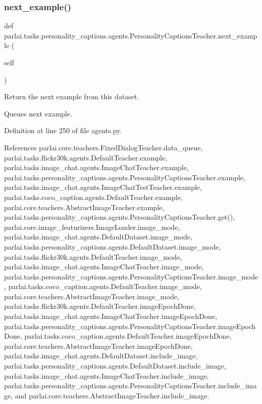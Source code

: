 \subsubsection{\texorpdfstring{next\+\_\+example()}{next\_example()}}
{\footnotesize\ttfamily def parlai.\+tasks.\+personality\+\_\+captions.\+agents.\+Personality\+Captions\+Teacher.\+next\+\_\+example (\begin{DoxyParamCaption}\item[{}]{self }\end{DoxyParamCaption})}

\begin{DoxyVerb}Return the next example from this dataset.

Queues next example.
\end{DoxyVerb}
 

Definition at line 250 of file agents.\+py.



References parlai.\+core.\+teachers.\+Fixed\+Dialog\+Teacher.\+data\+\_\+queue, parlai.\+tasks.\+flickr30k.\+agents.\+Default\+Teacher.\+example, parlai.\+tasks.\+image\+\_\+chat.\+agents.\+Image\+Chat\+Teacher.\+example, parlai.\+tasks.\+personality\+\_\+captions.\+agents.\+Personality\+Captions\+Teacher.\+example, parlai.\+tasks.\+image\+\_\+chat.\+agents.\+Image\+Chat\+Test\+Teacher.\+example, parlai.\+tasks.\+coco\+\_\+caption.\+agents.\+Default\+Teacher.\+example, parlai.\+core.\+teachers.\+Abstract\+Image\+Teacher.\+example, parlai.\+tasks.\+personality\+\_\+captions.\+agents.\+Personality\+Captions\+Teacher.\+get(), parlai.\+core.\+image\+\_\+featurizers.\+Image\+Loader.\+image\+\_\+mode, parlai.\+tasks.\+image\+\_\+chat.\+agents.\+Default\+Dataset.\+image\+\_\+mode, parlai.\+tasks.\+personality\+\_\+captions.\+agents.\+Default\+Dataset.\+image\+\_\+mode, parlai.\+tasks.\+flickr30k.\+agents.\+Default\+Teacher.\+image\+\_\+mode, parlai.\+tasks.\+image\+\_\+chat.\+agents.\+Image\+Chat\+Teacher.\+image\+\_\+mode, parlai.\+tasks.\+personality\+\_\+captions.\+agents.\+Personality\+Captions\+Teacher.\+image\+\_\+mode, parlai.\+tasks.\+coco\+\_\+caption.\+agents.\+Default\+Teacher.\+image\+\_\+mode, parlai.\+core.\+teachers.\+Abstract\+Image\+Teacher.\+image\+\_\+mode, parlai.\+tasks.\+flickr30k.\+agents.\+Default\+Teacher.\+image\+Epoch\+Done, parlai.\+tasks.\+image\+\_\+chat.\+agents.\+Image\+Chat\+Teacher.\+image\+Epoch\+Done, parlai.\+tasks.\+personality\+\_\+captions.\+agents.\+Personality\+Captions\+Teacher.\+image\+Epoch\+Done, parlai.\+tasks.\+coco\+\_\+caption.\+agents.\+Default\+Teacher.\+image\+Epoch\+Done, parlai.\+core.\+teachers.\+Abstract\+Image\+Teacher.\+image\+Epoch\+Done, parlai.\+tasks.\+image\+\_\+chat.\+agents.\+Default\+Dataset.\+include\+\_\+image, parlai.\+tasks.\+personality\+\_\+captions.\+agents.\+Default\+Dataset.\+include\+\_\+image, parlai.\+tasks.\+image\+\_\+chat.\+agents.\+Image\+Chat\+Teacher.\+include\+\_\+image, parlai.\+tasks.\+personality\+\_\+captions.\+agents.\+Personality\+Captions\+Teacher.\+include\+\_\+image, and parlai.\+core.\+teachers.\+Abstract\+Image\+Teacher.\+include\+\_\+image.

